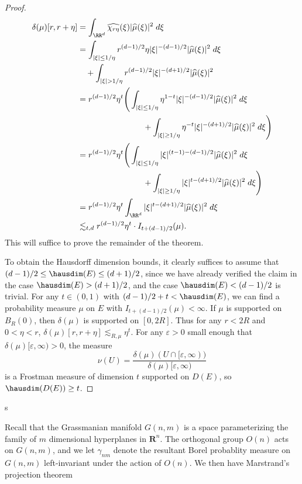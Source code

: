 \begin{proof}
\begin{align*}
		\delta(\mu)[r,r+\eta] &= \int_{\RR^d} \widehat{\chi_{r\eta}}(\xi)|\widehat{\mu}(\xi)|^2\; d\xi\\
		&= \int_{|\xi| \leq 1/\eta} r^{(d-1)/2} \eta |\xi|^{-(d-1)/2} |\widehat{\mu}(\xi)|^2\; d\xi\\
		&\quad + \int_{|\xi| > 1/\eta} r^{(d-1)/2} |\xi|^{-(d+1)/2} |\widehat{\mu}(\xi)|^2\\
		&= r^{(d-1)/2} \eta^t \Bigg( \int_{|\xi| \leq 1/\eta} \eta^{1-t} |\xi|^{-(d-1)/2} |\widehat{\mu}(\xi)|^2\; d\xi\\
		&\quad\quad\quad\quad\quad\quad\quad\quad + \int_{|\xi| \geq 1/\eta} \eta^{-t} |\xi|^{-(d+1)/2} |\widehat{\mu}(\xi)|^2\; d\xi \Bigg)\\
		&= r^{(d-1)/2} \eta^t \Bigg( \int_{|\xi| \leq 1/\eta} |\xi|^{(t-1)-(d-1)/2} |\widehat{\mu}(\xi)|^2\; d\xi\\
		&\quad\quad\quad\quad\quad\quad\quad\quad + \int_{|\xi| \geq 1/\eta} |\xi|^{t - (d+1)/2} |\widehat{\mu}(\xi)|^2\; d\xi \Bigg)\\
		&= r^{(d-1)/2} \eta^t \int_{\RR^d} |\xi|^{t - (d+1)/2} |\widehat{\mu}(\xi)|^2\; d\xi\\
		&\lesssim_{t,d} r^{(d-1)/2} \eta^t \cdot I_{t + (d-1)/2}(\mu).
	\end{align*}
	This will suffice to prove the remainder of the theorem.

	To obtain the Hausdorff dimension bounds, it clearly suffices to assume that $(d-1)/2 \leq \hausdim(E) \leq (d+1)/2$, since we have already verified the claim in the case $\hausdim(E) > (d+1)/2$, and the case $\hausdim(E) < (d-1)/2$ is trivial. For any $t \in (0,1)$ with $(d-1)/2 + t < \hausdim(E)$, we can find a probability measure $\mu$ on $E$ with $I_{t + (d-1)/2}(\mu) < \infty$. If $\mu$ is supported on $B_R(0)$, then $\delta(\mu)$ is supported on $[0,2R]$. Thus for any $r < 2R$ and $0 < \eta < r$, $\delta(\mu)[r,r+\eta] \lesssim_{R,\mu} \eta^t$. For any $\varepsilon > 0$ small enough that $\delta(\mu)[\varepsilon,\infty) > 0$, the measure
	\[ \nu(U) = \frac{\delta(\mu)(U \cap [\varepsilon,\infty))}{\delta(\mu)[\varepsilon,\infty)} \]
	is a Frostman measure of dimension $t$ supported on $D(E)$, so $\hausdim(D(E)) \geq t$.
\end{proof}

\begin{remark}
	s
\end{remark}




Recall that the Grassmanian manifold $G(n,m)$ is a space parameterizing the family of $m$ dimensional hyperplanes in $\mathbf{R}^n$. The orthogonal group $O(n)$ acts on $G(n,m)$, and we let $\gamma_{nm}$ denote the resultant Borel probablity measure on $G(n,m)$ left-invariant under the action of $O(n)$. We then have Marstrand's projection theorem

